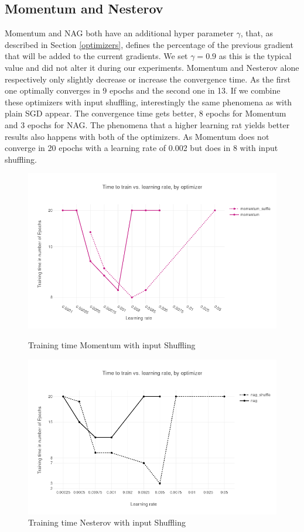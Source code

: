 \subsection{Momentum and Nesterov}
Momentum\cite{momentum} and NAG \cite{nag} both have an additional hyper parameter $\gamma$, that, as described in Section \ref{optimizers}, defines the percentage of the previous gradient that will be added to the current gradients. We set $\gamma = 0.9$ as this is the typical value and did not alter it during our experiments. Momentum and Nesterov alone respectively only slightly decrease or increase the convergence time. As the first one optimally converges in 9 epochs and the second one in 13. If we combine these optimizers with input shuffling, interestingly the same phenomena as with plain SGD appear. The convergence time gets better, 8 epochs for Momentum  and 3 epochs for NAG. The phenomena that a higher learning rat yields better results also happens with both of the optimizers. As Momentum does not converge in 20 epochs with a learning rate of 0.002 but does in 8 with input shuffling. 
\begin{figure}[h]
\centering
\begin{minipage}{.5\textwidth}
  \centering
  	\includegraphics[scale=0.3]{images/results_mom_shuffle} 
    \caption{Training time  Momentum with input Shuffling}
    \label{fig:results_mom}
  \label{fig:test1}
\end{minipage}%
\begin{minipage}{.5\textwidth}
  \centering
	\includegraphics[scale=0.3]{images/results_nag_shuffle} 
    \caption{Training time  Nesterov with input Shuffling}
    \label{fig:results_nag}
\end{minipage}
\end{figure}
